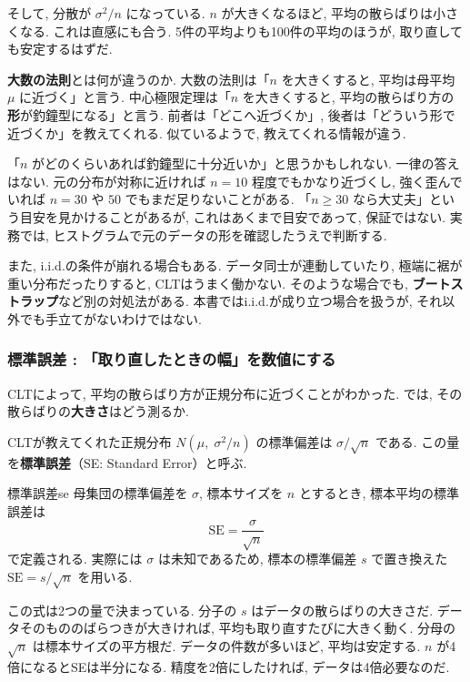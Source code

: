     そして, 分散が $\sigma^2 / n$ になっている.
    $n$ が大きくなるほど, 平均の散らばりは小さくなる.
    これは直感にも合う.
    5件の平均よりも100件の平均のほうが, 取り直しても安定するはずだ.

    \textbf{大数の法則}とは何が違うのか.
    大数の法則は「$n$ を大きくすると, 平均は母平均 $\mu$ に近づく」と言う.
    中心極限定理は「$n$ を大きくすると, 平均の散らばり方の\textbf{形}が釣鐘型になる」と言う.
    前者は「どこへ近づくか」, 後者は「どういう形で近づくか」を教えてくれる.
    似ているようで, 教えてくれる情報が違う.

    「$n$ がどのくらいあれば釣鐘型に十分近いか」と思うかもしれない.
    一律の答えはない.
    元の分布が対称に近ければ $n = 10$ 程度でもかなり近づくし, 強く歪んでいれば $n = 30$ や $50$ でもまだ足りないことがある.
    「$n \geq 30$ なら大丈夫」という目安を見かけることがあるが, これはあくまで目安であって, 保証ではない.
    実務では, ヒストグラムで元のデータの形を確認したうえで判断する.

    また, i.i.d.の条件が崩れる場合もある.
    データ同士が連動していたり, 極端に裾が重い分布だったりすると, CLTはうまく働かない.
    そのような場合でも, \textbf{ブートストラップ}など別の対処法がある.
    本書ではi.i.d.が成り立つ場合を扱うが, それ以外でも手立てがないわけではない.

    \subsubsection{標準誤差 : 「取り直したときの幅」を数値にする}

    CLTによって, 平均の散らばり方が正規分布に近づくことがわかった.
    では, その散らばりの\textbf{大きさ}はどう測るか.

    CLTが教えてくれた正規分布 $N(\mu,\; \sigma^2/n)$ の標準偏差は $\sigma / \sqrt{n}$ である.
    この量を\textbf{標準誤差}（SE: Standard Error）と呼ぶ.

\begin{defi}{標準誤差}{se}
  母集団の標準偏差を $\sigma$, 標本サイズを $n$ とするとき, 標本平均の標準誤差は
  \[
    \mathrm{SE} = \frac{\sigma}{\sqrt{n}}
  \]
  で定義される.
  実際には $\sigma$ は未知であるため, 標本の標準偏差 $s$ で置き換えた $\mathrm{SE} = s / \sqrt{n}$ を用いる.
\end{defi}

    この式は2つの量で決まっている.
    分子の $s$ はデータの散らばりの大きさだ.
    データそのもののばらつきが大きければ, 平均も取り直すたびに大きく動く.
    分母の $\sqrt{n}$ は標本サイズの平方根だ.
    データの件数が多いほど, 平均は安定する.
    $n$ が4倍になるとSEは半分になる.
    精度を2倍にしたければ, データは4倍必要なのだ.

